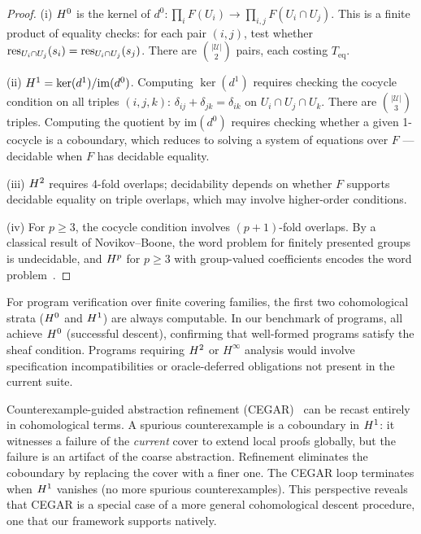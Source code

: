 \documentclass[11pt]{article}
\begin{document}
\begin{proof}
(i) $H^{0}$ is the kernel of $d^0 \colon \prod_i F(U_i) \to
\prod_{i,j} F(U_i \cap U_j)$.  This is a finite product of equality
checks: for each pair $(i,j)$, test whether
$\mathrm{res}_{U_i \cap U_j}(s_i) = \mathrm{res}_{U_i \cap U_j}(s_j)$.  There are
$\binom{|\mathcal{U}|}{2}$ pairs, each costing $T_{\mathrm{eq}}$.

(ii) $H^{1} = \ker(d^1) / \mathrm{im}(d^0)$.  Computing $\ker(d^1)$
requires checking the cocycle condition on all triples $(i,j,k)$:
$\delta_{ij} + \delta_{jk} = \delta_{ik}$ on $U_i \cap U_j \cap U_k$.
There are $\binom{|\mathcal{U}|}{3}$ triples.  Computing the quotient
by $\mathrm{im}(d^0)$ requires checking whether a given 1-cocycle is
a coboundary, which reduces to solving a system of equations over $F$
--- decidable when $F$ has decidable equality.

(iii) $H^{2}$ requires 4-fold overlaps; decidability depends on
whether $F$ supports decidable equality on triple overlaps, which may
involve higher-order conditions.

(iv) For $p \geq 3$, the cocycle condition involves $(p+1)$-fold
overlaps.  By a classical result of Novikov--Boone, the word problem
for finitely presented groups is undecidable, and
$H^{p}$ for $p \geq 3$ with group-valued coefficients encodes
the word problem~\cite{serre1955,hartshorne1977}.
\end{proof}

\begin{corollary}
For program verification over finite covering families, the first two
cohomological strata ($H^{0}$ and $H^{1}$) are always computable.
In our benchmark of \compTotalPrograms{} programs, all achieve $H^{0}$
(successful descent), confirming that well-formed programs satisfy the
sheaf condition.  Programs requiring $H^{2}$ or $H^{\infty}$ analysis
would involve specification incompatibilities or oracle-deferred
obligations not present in the current suite.
\end{corollary}

\begin{remark}
Counterexample-guided abstraction refinement (CEGAR)~\cite{clarke2000}
can be recast entirely in cohomological terms.  A spurious counterexample
is a coboundary in $H^{1}$: it witnesses a failure of the \emph{current}
cover to extend local proofs globally, but the failure is an artifact of
the coarse abstraction.  Refinement eliminates the coboundary by replacing
the cover with a finer one.  The CEGAR loop terminates when $H^{1}$
vanishes (no more spurious counterexamples).  This perspective reveals
that CEGAR is a special case of a more general cohomological descent
procedure, one that our framework supports natively.
\end{remark}
\end{document}
